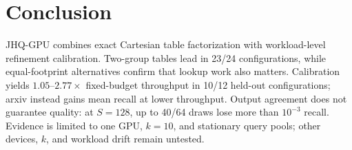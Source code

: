 \section{Conclusion}
\label{sec:conclu}





JHQ-GPU combines exact Cartesian table factorization with workload-level refinement calibration. Two-group tables lead in 23/24 configurations, while equal-footprint alternatives confirm that lookup work also matters. Calibration yields $1.05$--$2.77\times$ fixed-budget throughput in 10/12 held-out configurations; arxiv instead gains mean recall at lower throughput. Output agreement does not guarantee quality: at $S=128$, up to 40/64 draws lose more than $10^{-3}$ recall. Evidence is limited to one GPU, $k=10$, and stationary query pools; other devices, $k$, and workload drift remain untested.